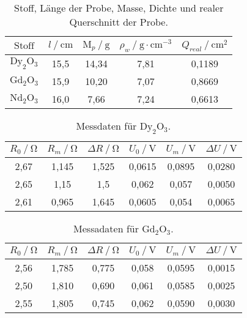 \begin{table}[H]
    \centering
    \caption{Stoff, Länge der Probe, Masse, Dichte und realer Querschnitt der Probe.}
    \label{tab:tab2}
    \begin{tabular}{S S S S S}
      \toprule
        {$\text{Stoff}$}&{$l \mathbin{/} \unit{\centi\meter} $}&{$\text{M}_p \mathbin{/} \unit{\gram} $}&{$ \rho_w \mathbin{/} \unit{\gram} \cdot \unit{\centi\meter}^{-3}$}&{$Q_{real} \mathbin{/} \unit{\centi\meter}^{2}$}\\
        \midrule
        {$\text{Dy}_2 \text{O}_3$} & {15,5}& {14,34}&{7,81\cite{ap07}}&{0,1189}\\
        {$\text{Gd}_2 \text{O}_3$} & {15,9}& {10,20}&{7,07\cite{ap07}}&{0,8669}\\
        {$\text{Nd}_2 \text{O}_3$} & {16,0}& {7,66 }&{7,24\cite{ap07}}&{0,6613}\\
      \bottomrule
    \end{tabular}
\end{table}


\begin{table}[H]
    \centering
    \caption{Messdaten für $\text{Dy}_2 \text{O}_3$.}
    \label{tab:tab3}
    \begin{tabular}{S S S S S S}
      \toprule
        {$ R_0 \mathbin{/} \unit{\ohm} $}&{$R_m \mathbin{/} \unit{\ohm} $}&{$ \Delta R \mathbin{/} \unit{\ohm}$}&{$ U_0 \mathbin{/} \unit{\volt}$}&{$U_m \mathbin{/} \unit{\volt}$}&{$\Delta U \mathbin{/} \unit{\volt}$}\\
        \midrule
        {2,67} & {1,145}&  {1,525}&{0,0615}&{0,0895}&{0,0280}\\
        {2,65} & {1,15} &  {1,5}  &{0,062} &{0,057} &{0,0050}\\
        {2,61} & {0,965}&  {1,645}&{0,0605}&{0,054} &{0,0065}\\
      \bottomrule
    \end{tabular}
\end{table}

\begin{table}[H]
    \centering
    \caption{Messadaten für $\text{Gd}_2 \text{O}_3$.}
    \label{tab:tab4}
    \begin{tabular}{S S S S S S}
      \toprule
        {$ R_0 \mathbin{/} \unit{\ohm} $}&{$R_m \mathbin{/} \unit{\ohm} $}&{$ \Delta R \mathbin{/} \unit{\ohm}$}&{$ U_0 \mathbin{/} \unit{\volt}$}&{$U_m \mathbin{/} \unit{\volt}$}&{$\Delta U \mathbin{/} \unit{\volt}$}\\
        \midrule
        {2,56} & {1,785}&  {0,775}&{0,058}&{0,0595}&{0,0015}\\
        {2,50} & {1,810}&  {0,690}&{0,061}&{0,0585}&{0,0025}\\
        {2,55} & {1,805}&  {0,745}&{0,062}&{0,0590}&{0,0030}\\
      \bottomrule
    \end{tabular}
\end{table}

